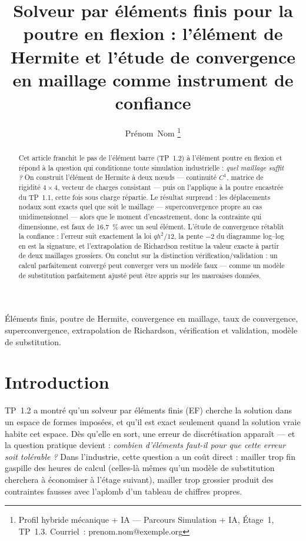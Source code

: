 \documentclass[10pt,journal]{IEEEtran}
\begin{document}
\title{Solveur par éléments finis pour la poutre en flexion : l'élément de Hermite et l'étude de convergence en maillage comme instrument de confiance}

\author{Prénom~Nom%
\thanks{Profil hybride mécanique + IA --- Parcours Simulation + IA, Étage~1, TP~1.3. Courriel~: prenom.nom@exemple.org}}


\maketitle

\begin{abstract}
Cet article franchit le pas de l'élément barre (TP~1.2) à l'élément poutre en flexion et répond à la question qui conditionne toute simulation industrielle : \emph{quel maillage suffit ?} On construit l'élément de Hermite à deux n\oe{}uds --- continuité $C^1$, matrice de rigidité $4\times 4$, vecteur de charges consistant --- puis on l'applique à la poutre encastrée du TP~1.1, cette fois sous charge répartie. Le résultat surprend : les déplacements nodaux sont exacts quel que soit le maillage --- superconvergence propre au cas unidimensionnel --- alors que le moment d'encastrement, donc la contrainte qui dimensionne, est faux de 16,7~\% avec un seul élément. L'étude de convergence rétablit la confiance : l'erreur suit exactement la loi $qh^2/12$, la pente $-2$ du diagramme log--log en est la signature, et l'extrapolation de Richardson restitue la valeur exacte à partir de deux maillages grossiers. On conclut sur la distinction vérification/validation : un calcul parfaitement convergé peut converger vers un modèle faux --- comme un modèle de substitution parfaitement ajusté peut être appris sur les mauvaises données.
\end{abstract}

\begin{IEEEkeywords}
Éléments finis, poutre de Hermite, convergence en maillage, taux de convergence, superconvergence, extrapolation de Richardson, vérification et validation, modèle de substitution.
\end{IEEEkeywords}

\IEEEpeerreviewmaketitle

\section{Introduction}
 TP~1.2 a montré qu'un solveur par éléments finis (EF) cherche la solution dans un espace de formes imposées, et qu'il est exact seulement quand la solution vraie habite cet espace. Dès qu'elle en sort, une erreur de discrétisation apparaît --- et la question pratique devient : \emph{combien d'éléments faut-il pour que cette erreur soit tolérable ?} Dans l'industrie, cette question a un coût direct : mailler trop fin gaspille des heures de calcul (celles-là mêmes qu'un modèle de substitution cherchera à économiser à l'étage suivant), mailler trop grossier produit des contraintes fausses avec l'aplomb d'un tableau de chiffres propres.
\end{document}
